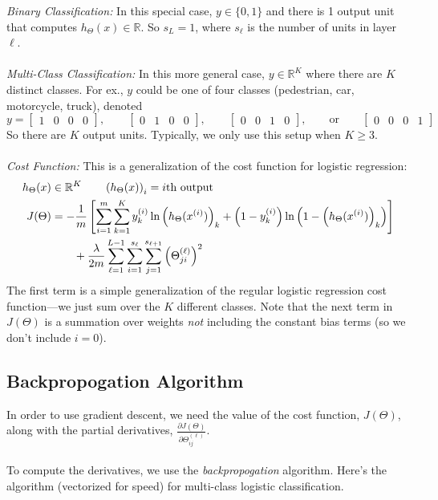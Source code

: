 \documentclass[12pt]{article}
\begin{document}
{\sl Binary Classification:} In this special case, $y \in \{ 0, 1\}$
and there is 1 output unit that computes $h_\Theta(x) \in \mathbb{R}$.
So $s_L = 1$, where $s_\ell$ is the number of units in layer $\ell$.
\\
\\
{\sl Multi-Class Classification:} In this more general case,
$y\in \mathbb{R}^K$ where there are $K$ distinct classes.
For ex., $y$ could be one of four classes (pedestrian,
car, motorcycle, truck), denoted
\[ y = \begin{bmatrix} 1 & 0 & 0 & 0 \end{bmatrix}, \qquad
   \begin{bmatrix} 0 & 1 & 0 & 0 \end{bmatrix}, \qquad
   \begin{bmatrix} 0 & 0 & 1 & 0 \end{bmatrix}, \qquad\text{or}\qquad
   \begin{bmatrix} 0 & 0 & 0 & 1 \end{bmatrix} \]
So there are $K$ output units. Typically, we only use this setup
when $K\geq 3$.
\\
\\
{\sl Cost Function:}
This is a generalization of the cost function for
logistic regression:
\begin{align}
   h_\Theta(x) &\in \mathbb{R}^K \qquad \left(h_\Theta(x)\right)_i =
   \text{$i$th output} \notag\\
   J(\Theta) &= -\frac{1}{m} \left[\sum^m_{i=1}\sum^K_{k=1} y_k^{(i)}
   \ln \left(h_\Theta(x^{(i)})\right)_k + \left(1-y_k^{(i)}\right)
   \ln \left(1-\left(h_\Theta(x^{(i)})\right)_k\right)
   \right] \notag\\
   &\qquad + \frac{\lambda}{2m} \sum^{L-1}_{\ell=1} \sum^{s_\ell}_{i=1}
   \sum^{s_{\ell+1}}_{j=1} \left(\Theta^{(\ell)}_{ji}\right)^2
\end{align}
The first term is a simple generalization of the regular
logistic regression cost function---we just sum over the $K$ different
classes. Note that the next term in $J(\Theta)$ is a summation over
weights \emph{not} including the constant bias terms (so we don't
include $i=0$).

\newpage
\subsection{Backpropogation Algorithm}

In order to use gradient descent, we need the value of the
cost function, $J(\Theta)$, along with the partial derivatives,
$\frac{\partial J(\Theta)}{\partial \Theta^{(\ell)}_{ij}}$.
\\
\\
To compute the derivatives, we use the \emph{backpropogation} algorithm.
Here's the algorithm (vectorized for speed) for multi-class logistic
classification.
\end{document}
